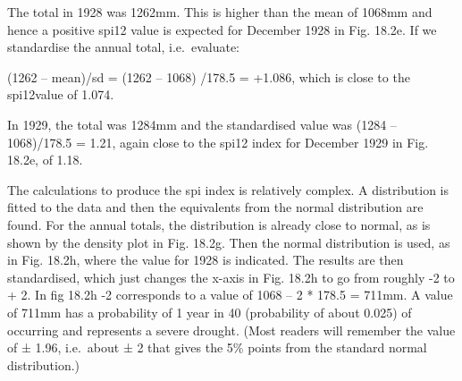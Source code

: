 \documentclass[
  letterpaper,
  DIV=11,
  numbers=noendperiod]{scrreprt}
\begin{document}
The total in 1928 was 1262mm. This is higher than the mean of 1068mm and
hence a positive spi12 value is expected for December 1928 in Fig.
18.2e. If we standardise the annual total, i.e.~evaluate:

(1262 -- mean)/sd = (1262 -- 1068) /178.5 = +1.086, which is close to
the spi12value of 1.074.

In 1929, the total was 1284mm and the standardised value was (1284 --
1068)/178.5 = 1.21, again close to the spi12 index for December 1929 in
Fig. 18.2e, of 1.18.

The calculations to produce the spi index is relatively complex. A
distribution is fitted to the data and then the equivalents from the
normal distribution are found. For the annual totals, the distribution
is already close to normal, as is shown by the density plot in Fig.
18.2g. Then the normal distribution is used, as in Fig. 18.2h, where the
value for 1928 is indicated. The results are then standardised, which
just changes the x-axis in Fig. 18.2h to go from roughly -2 to + 2. In
fig 18.2h -2 corresponds to a value of 1068 -- 2 * 178.5 = 711mm. A
value of 711mm has a probability of 1 year in 40 (probability of about
0.025) of occurring and represents a severe drought. (Most readers will
remember the value of ± 1.96, i.e.~about ± 2 that gives the 5\% points
from the standard normal distribution.)
\end{document}
